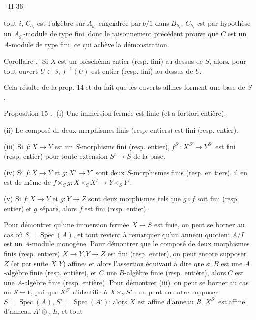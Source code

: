 \newpage


- II-36 -

tout $i$, $C_{h_i}$ est l'algèbre sur $A_{g_i}$ engendrée par $b/1$ dans $B_{h_i}$, $C_{h_i}$
est par hypothèse un $A_{g_i}$-module de type fini, donc le raisonnement
précédent prouve que $C$ est un $A$-module de type fini, ce qui achève
la démonstration.

Corollaire .- Si $X$ est un préschéma entier (resp. fini) au-dessus de
$S$, alors, pour tout ouvert $U \subset S$, $f^{-1}(U)$ est entier (resp. fini)
au-dessus de $U$.

Cela résulte de la prop. 14 et du fait que les ouverts affines forment
une base de $S$.

Proposition 15 .- (i) Une immersion fermée est finie (et a fortiori
entière).

(ii) Le composé de deux morphismes finis (resp. entiers) est fini
(resp. entier).

(iii) Si $f : X \to Y$ est un $S$-morphisme fini (resp. entier), $f^{S'} : X^{S'} \to Y^{S'}$
est fini (resp. entier) pour toute extension $S' \to S$ de la base.

(iv) Si $f : X \to Y$ et $g : X' \to Y'$ sont deux $S$-morphismes finis (resp. en
tiers), il en est de même de $f \times_S g : X \times_S X' \to Y \times_S Y'$.

(v) Si $f : X \to Y$ et $g : Y \to Z$ sont deux morphismes tels que $g \circ f$ soit
fini (resp. entier) et $g$ séparé, alors $f$ est fini (resp. entier).

Pour démontrer qu'une immersion fermée $X \to S$ est finie, on peut se
borner au cas où $S = \operatorname{Spec}(A)$, et tout revient à remarquer qu'un
anneau quotient $A/I$ est un $A$-module monogène. Pour démontrer que le
composé de deux morphismes finis (resp. entiers) $X \to Y, Y \to Z$ est fini
(resp. entier), on peut encore supposer $Z$ (et par suite $X, Y$) affines
et alors l'assertion équivaut à dire que si $B$ est une $A$-algèbre finie
(resp. entière), et $C$ une $B$-algèbre finie (resp. entière), alors
$C$ est une $A$-algèbre finie (resp. entière). Pour démontrer (iii), on
peut se borner au cas où $S = Y$, puisque $X^{S'}$ s'identifie à $X \times_Y S'$ ;
on peut en outre supposer $S = \operatorname{Spec}(A)$, $S' = \operatorname{Spec}(A')$; alors $X$ est affine
d'anneau $B$, $X^{S'}$ est affine d'anneau $A' \otimes_A B$, et tout

\newpage


